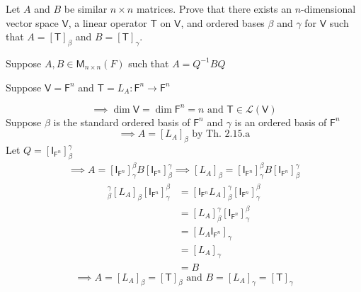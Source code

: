Let $A$ and $B$ be similar $n \times n$ matrices. Prove that there
exists an $n$-dimensional vector space $\mathsf{V}$, a linear operator
$\mathsf{T}$ on $\mathsf{V}$, and ordered bases $\beta$ and $\gamma$
for $\mathsf{V}$ such that $A=[\mathsf{T}]_\beta$ and
$B=[\mathsf{T}]_\gamma$.

Suppose $A,B \in \mathsf{M}_{n\times n}(F)$ such that $A = Q^{-1}BQ$

Suppose $\mathsf{V}=\mathsf{F}^n$ and $\mathsf{T} = L_A\colon
\mathsf{F}^n\to\mathsf{F}^n$

\begin{equation}
\implies \dim{\mathsf{V}} = \dim{\mathsf{F}^n} = n \text{ and }
\mathsf{T} \in \mathcal{L}(\mathsf{V})
\end{equation}
Suppose $\beta$ is the standard ordered basis of $\mathsf{F}^n$ and
$\gamma$ is an ordered basis of $\mathsf{F}^n$
\begin{equation}
\implies A = [L_A]_\beta \text{ by Th. 2.15.a}
\end{equation}
Let $Q = [\mathsf{I}_{\mathsf{F}^n}]_\beta^\gamma$
\begin{gather}
\implies A = [\mathsf{I}_{\mathsf{F}^n}]_\gamma^\beta B[\mathsf{I}_{\mathsf{F}^n}]^\gamma_\beta
\implies [L_A]_\beta = [\mathsf{I}_{\mathsf{F}^n}]_\gamma^\beta B[\mathsf{I}_{\mathsf{F}^n}]^\gamma_\beta
\end{gather}
\begin{align}
 [\mathsf{I}_{\mathsf{F}^n}]^\gamma_\beta
 [L_A]_\beta[\mathsf{I}_{\mathsf{F}^n}]_\gamma^\beta & =
 [\mathsf{I}_{\mathsf{F}^n}L_A]_\beta^\gamma[\mathsf{I}_{\mathsf{F}^n}]_\gamma^\beta\\
&= [L_A]_\beta^\gamma[\mathsf{I}_{\mathsf{F}^n}]_\gamma^\beta\\
&= [L_A\mathsf{I}_{\mathsf{F}^n}]_\gamma\\
&= [L_A]_\gamma\\
&= B
\end{align}
\begin{equation}
\implies A = [L_A]_\beta = [\mathsf{T}]_\beta \text{ and } B = [L_A]_\gamma=[\mathsf{T}]_\gamma
\end{equation}

